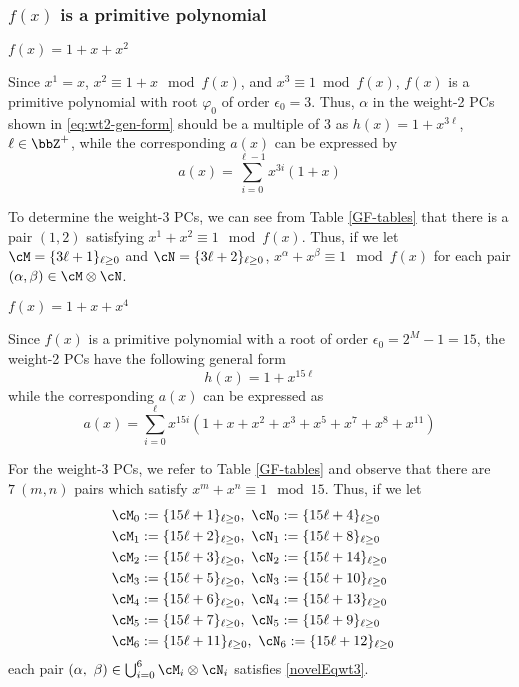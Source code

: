 \subsubsection{$f(x)$ is a primitive polynomial}

\begin{example}$f(x)=1+x+x^2$
	
Since $x^1=x$, $x^2 \equiv 1+x \mod f(x)$, and $x^3 \equiv 1 \bmod f(x)$, $f(x)$ is a primitive polynomial with root $\varphi_0$ of order $\epsilon_0=3$. Thus, $\alpha$ in the weight-2 PCs shown in \eqref{eq:wt2-gen-form} should be a multiple of $3$ as $h(x)=1+x^{3\ell}$, $\ell \in \bbZ^+$, while the corresponding $a(x)$ can be expressed by 
\begin{equation*}
	a(x)=\sum_{i=0}^{\ell-1} x^{3i}(1+x)
\end{equation*}

To determine the weight-3 PCs, we can see from Table \ref{GF-tables} that there is a pair $(1,2)$ satisfying $x^1+x^2 \equiv 1 \mod f(x)$. Thus, if we let $\cM = \{3\ell+1\}_{\ell\geq 0}$ and $\cN = \{3\ell+2\}_{\ell\geq 0}$, $x^\alpha+x^\beta \equiv 1 \mod f(x)$ for each pair $(\alpha,\beta) \in \cM\otimes\cN$.
\label{Ex:1}
\end{example}

\begin{example}	$f(x)= 1+x+x^4~$
	
	Since $f(x)$ is a primitive polynomial with a root of order $\epsilon_0=2^M-1=15$, the weight-2 PCs have the following general form
	$$h(x)=1+x^{15\ell}$$
	while the corresponding $a(x)$ can be expressed as 
	$$ a(x) = \sum_{i=0}^{\ell} x^{15i} \left(1 +x +x^2 +x^3+x^5+x^7+x^8+x^{11} \right)$$
	
	For the weight-3 PCs, we refer to Table \ref{GF-tables} and observe that there are $7~(m,n)$ pairs which satisfy $x^m+x^n \equiv 1 \mod 15$. Thus, if we let
	\begin{align}
	\cM_0 &:= \{15\ell + 1\}_{\ell \geq 0},~\cN_0 := \{15\ell + 4\}_{\ell \geq 0}\cr
	\cM_1 &:= \{15\ell + 2\}_{\ell \geq 0},~\cN_1 := \{15\ell + 8\}_{\ell \geq 0}\cr
	\cM_2 &:= \{15\ell + 3\}_{\ell \geq 0},~\cN_2 := \{15\ell + 14\}_{\ell \geq 0}\cr
	\cM_3 &:= \{15\ell + 5\}_{\ell \geq 0},~\cN_3 := \{15\ell + 10\}_{\ell \geq 0}\cr
	\cM_4 &:= \{15\ell + 6\}_{\ell \geq 0},~\cN_4 := \{15\ell + 13\}_{\ell \geq 0}\cr
	\cM_5 &:= \{15\ell + 7\}_{\ell \geq 0},~\cN_5 := \{15\ell + 9\}_{\ell \geq 0}\cr
	\cM_6 &:= \{15\ell + 11\}_{\ell \geq 0},~\cN_6 := \{15\ell + 12\}_{\ell \geq 0}
	\end{align}
	each pair $(\alpha,~\beta) \in \bigcup_{i=0}^6 \cM_i\otimes\cN_i$ satisfies \eqref{novelEqwt3}.
	\label{Ex:2}	
\end{example}

